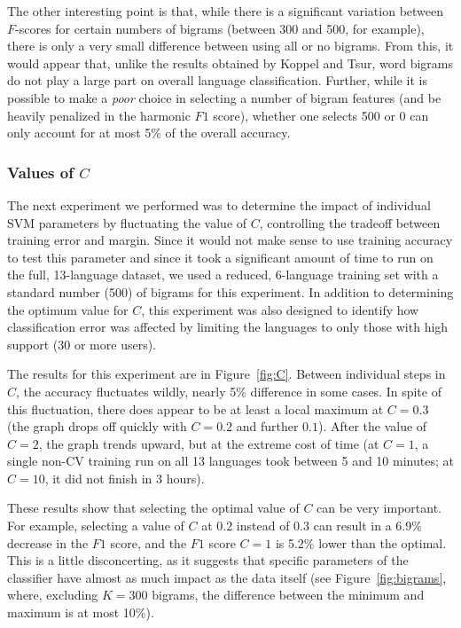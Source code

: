 \documentclass[11pt]{article}
\begin{document}
The other interesting point is that, while there is a significant variation between $F$-scores for certain numbers of bigrams (between 300 and 500, for example), there is only a very small difference between using all or no bigrams.  From this, it would appear that, unlike the results obtained by Koppel and Tsur, word bigrams do not play a large part on overall language classification.  Further, while it is possible to make a {\it poor} choice in selecting a number of bigram features (and be heavily penalized in the harmonic $F1$ score), whether one selects 500 or 0 can only account for at most 5\% of the overall accuracy.



\subsubsection{Values of $C$}\label{sec:c}

The next experiment we performed was to determine the impact of individual SVM parameters by fluctuating the value of $C$, controlling the tradeoff between training error and margin.  Since it would not make sense to use training accuracy to test this parameter and since it took a significant amount of time to run on the full, 13-language dataset, we used a reduced, 6-language training set with a standard number (500) of bigrams for this experiment.  In addition to determining the optimum value for $C$, this experiment was also designed to identify how classification error was affected by limiting the languages to only those with high support (30 or more users).  

The results for this experiment are in Figure~\ref{fig:C}.  Between individual steps in $C$, the accuracy fluctuates wildly, nearly 5\% difference in some cases.  In spite of this fluctuation, there does appear to be at least a local maximum at $C=0.3$ (the graph drops off quickly with $C=0.2$ and further $0.1$).  After the value of $C=2$, the graph trends upward, but at the extreme cost of time (at $C=1$, a single non-CV training run on all 13 languages took between 5 and 10 minutes; at $C=10$, it did not finish in 3 hours).

These results show that selecting the optimal value of $C$ can be very important.  For example, selecting a value of $C$ at $0.2$ instead of $0.3$ can result in a 6.9\% decrease in the $F1$ score, and the $F1$ score $C=1$ is 5.2\% lower than the optimal.  This is a little disconcerting, as it suggests that specific parameters of the classifier have almost as much impact as the data itself (see Figure~\ref{fig:bigrams}, where, excluding $K=300$ bigrams, the difference between the minimum and maximum is at most 10\%).
\end{document}
